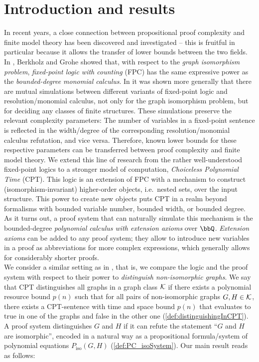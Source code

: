 \documentclass[10pt,a4paper]{article}
\newcommand{\Kk}{{\cal K}}
\newcommand{\Piso}{P_{\text{iso}}}
\begin{document}
	\section{Introduction and results}
	In recent years, a close connection between propositional proof complexity and finite model theory has been discovered and investigated -- this is fruitful in particular because it allows the transfer of lower bounds between the two fields. 
	In \cite{berkholz}, Berkholz and Grohe showed that, with respect to the \emph{graph isomorphism problem}, \emph{fixed-point logic with counting} (FPC) has the same expressive power as the \emph{bounded-degree monomial calculus}. In \cite{ggpp} it was shown more generally that there are mutual simulations between different variants of fixed-point logic and resolution/monomial calculus, not only for the graph isomorphism problem, but for deciding any classes of finite structures. These simulations preserve the relevant complexity parameters: The number of variables in a fixed-point sentence is reflected in the width/degree of the corresponding resolution/monomial calculus refutation, and vice versa. Therefore, known lower bounds for these respective parameters can be transferred between proof complexity and finite model theory. We extend this line of research from the rather well-understood fixed-point logics to a stronger model of computation, \emph{Choiceless Polynomial Time} (CPT). This logic is an extension of FPC with a mechanism to construct (isomorphism-invariant) higher-order objects, i.e.\ nested sets, over the input structure. This power to create new objects puts CPT in a realm beyond formalisms with bounded variable number, bounded width, or bounded degree. As it turns out, a proof system that can naturally simulate this mechanism is the bounded-degree \emph{polynomial calculus with extension axioms} over $\bbQ$. \emph{Extension axioms} can be added to any proof system; they allow to introduce new variables in a proof as abbreviations for more complex expressions, which generally allows for considerably shorter proofs.\\
	We consider a similar setting as in \cite{berkholz}, that is, we compare the logic and the proof system with respect to their power to \emph{distinguish non-isomorphic graphs}. We say that CPT distinguishes all graphs in a graph class $\Kk$ if there exists a polynomial resource bound $p(n)$ such that for all pairs of non-isomorphic graphs $G,H \in \Kk$, there exists a CPT-sentence with time and space bound $p(n)$ that evaluates to true in one of the graphs and false in the other one (\autoref{def:distinguishingInCPT}). A proof system distinguishes $G$ and $H$ if it can refute the statement ``$G$ and $H$ are isomorphic'', encoded in a natural way as a propositional formula/system of polynomial equations $\Piso(G,H)$ (\autoref{def:PC_isoSystem}). Our main result reads as follows:
\end{document}
